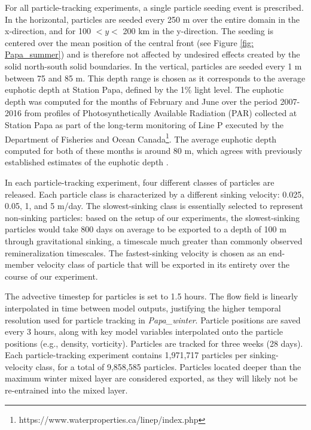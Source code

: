 \documentclass[article,linenumbers]{agujournal2018}
\begin{document}
For all particle-tracking experiments, a single particle seeding event is prescribed. In the horizontal, particles are seeded every 250 m over the entire domain in the x-direction, and for 100 $<y<$ 200 km in the y-direction. The seeding is centered over the mean position of the central front (see Figure \ref{fig: Papa_summer}) and is therefore not affected by undesired effects created by the solid north-south solid boundaries. In the vertical, particles are seeded every 1 m between 75 and 85 m. This depth range is chosen as it corresponds to the average euphotic depth at Station Papa, defined by the 1\% light level. The euphotic depth was computed for the months of February and June over the period 2007-2016 from profiles of Photosynthetically Available Radiation (PAR) collected at Station Papa as part of the long-term monitoring of Line P executed by the Department of Fisheries and Ocean Canada\footnote{https://www.waterproperties.ca/linep/index.php}. The average euphotic depth computed for both of these months is around 80 m, which agrees with previously established estimates of the euphotic depth \citep{Sherry_1999,Harrison_2004}.

In each particle-tracking experiment, four different classes of particles are released. Each particle class is characterized by a different sinking velocity: 0.025, 0.05, 1, and 5 m/day. The slowest-sinking class is essentially selected to represent non-sinking particles: based on the setup of our experiments, the slowest-sinking particles would take 800 days on average to be exported to a depth of 100 m through gravitational sinking, a timescale much greater than commonly observed remineralization timescales. The fastest-sinking velocity is chosen as an end-member velocity class of particle that will be exported in its entirety over the course of our experiment. %

The advective timestep for particles is set to 1.5 hours. The flow field is linearly interpolated in time between model outputs, justifying the higher temporal resolution used for particle tracking in \textit{Papa\_winter}. Particle positions are saved every 3 hours, along with key model variables interpolated onto the particle positions (e.g., density, vorticity). Particles are tracked for three weeks (28 days). Each particle-tracking experiment contains 1,971,717 particles per sinking-velocity class, for a total of 9,858,585 particles. Particles located deeper than the maximum winter mixed layer \citep[i.e., 100 m;][]{Pelland_2016, Plant_2016} are considered exported, as they will likely not be re-entrained into the mixed layer.
\end{document}

